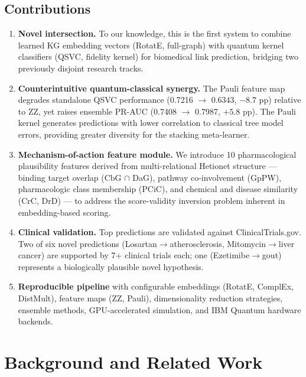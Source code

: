 \documentclass[twocolumn,10pt]{article}
\begin{document}
\subsection{Contributions}

\begin{enumerate}[leftmargin=*, label=\arabic*.]

\item \textbf{Novel intersection.} To our knowledge, this is the first system to combine learned KG embedding vectors (RotatE, full-graph) with quantum kernel classifiers (QSVC, fidelity kernel) for biomedical link prediction, bridging two previously disjoint research tracks.

\item \textbf{Counterintuitive quantum-classical synergy.} The Pauli feature map degrades standalone QSVC performance (0.7216 $\to$ 0.6343, $-8.7$ pp) relative to ZZ, yet raises ensemble PR-AUC (0.7408 $\to$ 0.7987, $+5.8$ pp). The Pauli kernel generates predictions with lower correlation to classical tree model errors, providing greater diversity for the stacking meta-learner.

\item \textbf{Mechanism-of-action feature module.} We introduce 10 pharmacological plausibility features derived from multi-relational Hetionet structure --- binding target overlap (CbG $\cap$ DaG), pathway co-involvement (GpPW), pharmacologic class membership (PCiC), and chemical and disease similarity (CrC, DrD) --- to address the score-validity inversion problem inherent in embedding-based scoring.

\item \textbf{Clinical validation.} Top predictions are validated against ClinicalTrials.gov. Two of six novel predictions (Losartan$\to$atherosclerosis, Mitomycin$\to$liver cancer) are supported by 7+ clinical trials each; one (Ezetimibe$\to$gout) represents a biologically plausible novel hypothesis.

\item \textbf{Reproducible pipeline} with configurable embeddings (RotatE, ComplEx, DistMult), feature maps (ZZ, Pauli), dimensionality reduction strategies, ensemble methods, GPU-accelerated simulation, and IBM Quantum hardware backends.

\end{enumerate}

\section{Background and Related Work}
\end{document}
